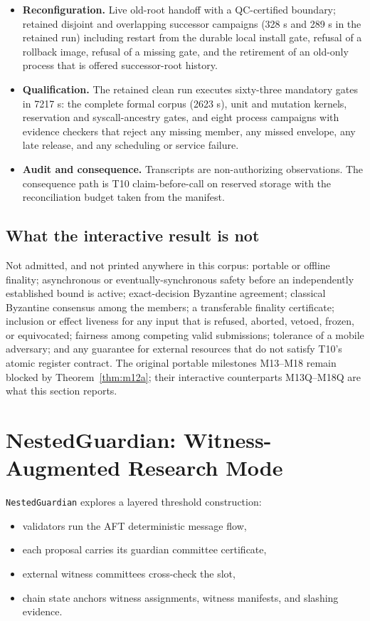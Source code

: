 \documentclass[11pt]{article}
\newcommand{\AFT}{\textsc{AFT}}
\newcommand{\code}[1]{\texttt{#1}}
\begin{document}
\begin{itemize}[leftmargin=1.5em]
\item \textbf{Reconfiguration.} Live old-root handoff with a QC-certified
boundary; retained disjoint and overlapping successor campaigns (328 s and
289 s in the retained run) including restart from the durable local install
gate, refusal of a rollback image, refusal of a missing gate, and the
retirement of an old-only process that is offered successor-root history.
\item \textbf{Qualification.} The retained clean run executes sixty-three
mandatory gates in 7217 s: the complete formal corpus (2623 s), unit and
mutation kernels, reservation and syscall-ancestry gates, and eight process
campaigns with evidence checkers that reject any missing member, any missed
envelope, any late release, and any scheduling or service failure.
\item \textbf{Audit and consequence.} Transcripts are non-authorizing
observations. The consequence path is T10 claim-before-call on reserved
storage with the reconciliation budget taken from the manifest.
\end{itemize}

\subsection{What the interactive result is not}
\label{sec:quv-boundaries}

Not admitted, and not printed anywhere in this corpus: portable or offline
finality; asynchronous or eventually-synchronous safety before an
independently established bound is active; exact-decision Byzantine
agreement; classical Byzantine consensus among the members; a transferable
finality certificate; inclusion or effect liveness for any input that is
refused, aborted, vetoed, frozen, or equivocated; fairness among competing
valid submissions; tolerance of a mobile adversary; and any guarantee for
external resources that do not satisfy T10's atomic register contract. The
original portable milestones M13--M18 remain blocked by Theorem~\ref{thm:m12a};
their interactive counterparts M13Q--M18Q are what this section reports.

\section{NestedGuardian: Witness-Augmented Research Mode}

\code{NestedGuardian} explores a layered threshold construction:

\begin{itemize}[leftmargin=1.5em]
\item validators run the \AFT{} deterministic message flow,
\item each proposal carries its guardian committee certificate,
\item external witness committees cross-check the slot,
\item chain state anchors witness assignments, witness manifests, and slashing
evidence.
\end{itemize}
\end{document}
